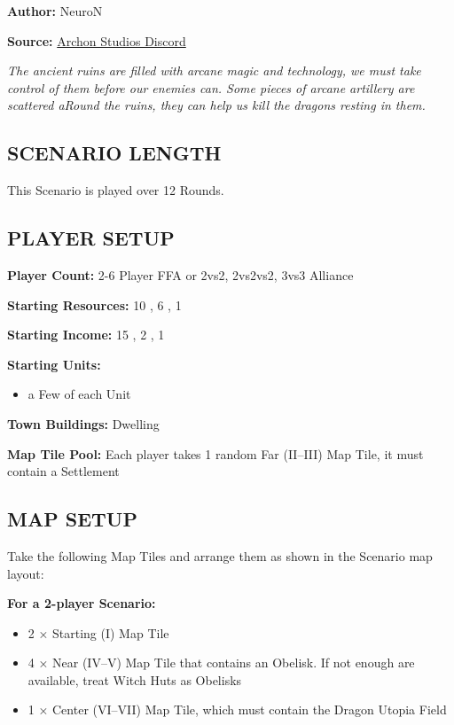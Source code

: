 
\begin{multicols}{2}

\textbf{Author:} NeuroN

\textbf{Source:} \href{https://discord.com/channels/740870068178649108/1279029213839626313}{Archon Studios Discord}

\textit{The ancient ruins are filled with arcane magic and technology, we must take control of them before our enemies can.
Some pieces of arcane artillery are scattered aRound the ruins, they can help us kill the dragons resting in them.}

\subsection*{\MakeUppercase{Scenario Length}}
This Scenario is played over 12 Rounds.

\subsection*{\MakeUppercase{Player Setup}}
\textbf{Player Count:} 2-6 Player FFA or 2vs2, 2vs2vs2, 3vs3 Alliance

\textbf{Starting Resources:} 10 , 6 , 1 

\textbf{Starting Income:} 15 , 2 , 1 

\textbf{Starting Units:}
\begin{itemize}
  \item a Few of each  Unit
\end{itemize}

\textbf{Town Buildings:}  Dwelling

\textbf{Map Tile Pool:} Each player takes 1 random Far (II--III) Map Tile, it must contain a Settlement

\subsection*{\MakeUppercase{Map Setup}}
Take the following Map Tiles and arrange them as shown in the Scenario map layout:

\textbf{For a 2-player Scenario:}
\begin{itemize}
  \item 2 × Starting (I) Map Tile
  \item 4 × Near (IV--V) Map Tile that contains an Obelisk. If not enough are available, treat Witch Huts as Obelisks
  \item 1 × Center (VI--VII) Map Tile, which must contain the Dragon Utopia Field
\end{itemize}


\end{multicols}

